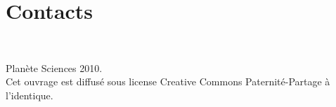 \documentclass[a4paper,12pt]{book}
\begin{document}
\section{Contacts}

\printglossaries

\clearpage
~
\vfill
\begin{center}
	Planète Sciences 2010.\\
	Cet ouvrage est diffusé sous license Creative Commons Paternité-Partage à l'identique.\\
\end{center}

\vfill
\end{document}
